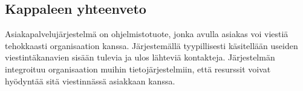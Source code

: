 \documentclass[finnish,12pt,a4paper,pdftex]{article}
\begin{document}









\subsection{Kappaleen yhteenveto}

Asiakapalvelujärjestelmä on ohjelmistotuote, jonka avulla asiakas voi viestiä tehokkaasti organisaation kanssa. Järjestemällä tyypillisesti käsitellään useiden viestintäkanavien sisään tulevia ja ulos lähteviä kontakteja. Järjestelmän integroituu organisaation muihin tietojärjestelmiin, että resurssit voivat hyödyntää sitä viestinnässä asiakkaan kanssa.\\
\end{document}
